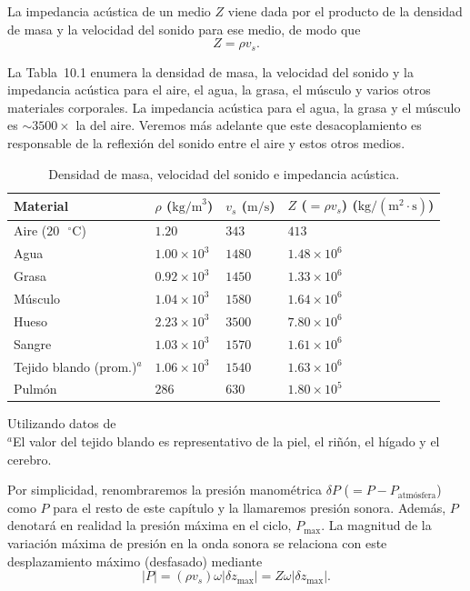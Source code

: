 \documentclass[12pt]{book}
\begin{document}
La impedancia acústica de un medio $Z$ viene dada por el producto de la densidad de masa y la velocidad del sonido para ese medio, de modo que
\begin{equation}
Z = \rho v_s.
\label{eq:10.7}
\end{equation}

La Tabla~10.1 enumera la densidad de masa, la velocidad del sonido y la impedancia acústica para el aire, el agua, la grasa, el músculo y varios otros materiales corporales. La impedancia acústica para el agua, la grasa y el músculo es $\sim 3500\times$ la del aire. Veremos más adelante que este desacoplamiento es responsable de la reflexión del sonido entre el aire y estos otros medios.

\begin{table}[h]
\centering
\caption{Densidad de masa, velocidad del sonido e impedancia acústica.}
\label{tab:101}
\small
\begin{tabularx}{\textwidth}{l >{\centering\arraybackslash}X >{\centering\arraybackslash}X >{\centering\arraybackslash}X}
\toprule
Material & $\rho$ ($\text{kg/m}^3$) & $v_s$ ($\text{m/s}$) & $Z$ ($= \rho v_s$) ($\text{kg/}(\text{m}^2\cdot\text{s})$) \\
\midrule
Aire ($20\text{ }^{\circ}\text{C}$) & $1.20$ & $343$ & $413$ \\
Agua & $1.00 \times 10^3$ & $1480$ & $1.48 \times 10^6$ \\
Grasa & $0.92 \times 10^3$ & $1450$ & $1.33 \times 10^6$ \\
Músculo & $1.04 \times 10^3$ & $1580$ & $1.64 \times 10^6$ \\
Hueso & $2.23 \times 10^3$ & $3500$ & $7.80 \times 10^6$ \\
Sangre & $1.03 \times 10^3$ & $1570$ & $1.61 \times 10^6$ \\
Tejido blando (prom.)$^a$ & $1.06 \times 10^3$ & $1540$ & $1.63 \times 10^6$ \\
Pulmón & $286$ & $630$ & $1.80 \times 10^5$ \\
\bottomrule
\end{tabularx}
\begin{flushleft}\small
Utilizando datos de~\cite{24, 51}\\
$^a$El valor del tejido blando es representativo de la piel, el riñón, el hígado y el cerebro.
\end{flushleft}
\end{table}
\FloatBarrier

Por simplicidad, renombraremos la presión manométrica $\delta P$ ($= P - P_{\text{atmósfera}}$) como $P$ para el resto de este capítulo y la llamaremos presión sonora. Además, $P$ denotará en realidad la presión máxima en el ciclo, $P_{\text{max}}$. La magnitud de la variación máxima de presión en la onda sonora se relaciona con este desplazamiento máximo (desfasado) mediante
\begin{equation}
|P| = (\rho v_s)\omega|\delta z_{\text{max}}| = Z\omega|\delta z_{\text{max}}|.
\label{eq:10.8}
\end{equation}
\end{document}
